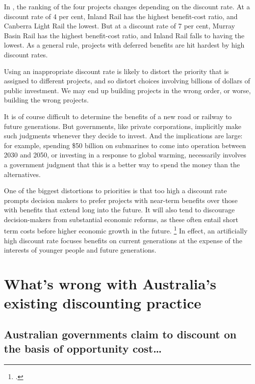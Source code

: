 \documentclass{grattan}
\begin{document}
In , the ranking of the four projects changes depending on the discount rate. At a discount rate of 4 per cent, Inland Rail has the highest benefit-cost ratio, and Canberra Light Rail the lowest. But at a discount rate of 7 per cent, Murray Basin Rail has the highest benefit-cost ratio, and Inland Rail falls to having the lowest. As a general rule, projects with deferred benefits are hit hardest by high discount rates.

Using an inappropriate discount rate is likely to distort the priority that is assigned to different projects, and so distort choices involving billions of dollars of public investment. We may end up building projects in the wrong order, or worse, building the wrong projects.

It is of course difficult to determine the benefits of a new road or railway to future generations. But governments, like private corporations, implicitly make such judgments whenever they decide to invest. And the implications are large: for example, spending \$50 billion on submarines to come into operation between 2030 and 2050, or investing in a response to global warming, necessarily involves a government judgment that this is a better way to spend the money than the alternatives.

One of the biggest distortions to priorities is that too high a discount rate prompts decision makers to prefer projects with near-term benefits over those with benefits that extend long into the future. It will also tend to discourage decision-makers from substantial economic reforms, as these often entail short term costs before higher economic growth in the future.%
    \footcite[][30]{Grimes-Beyond-Simple-CBA}
In effect, an artificially high discount rate focuses benefits on current generations at the expense of the interests of younger people and future generations.






\chapter{What’s wrong with Australia’s existing discounting practice}\label{chap:Australia-existing-discounting-practice}

\section{Australian governments claim to discount on the basis of opportunity cost\dots{}}\label{subsec:governments-claim-to-use-soc}
\end{document}
